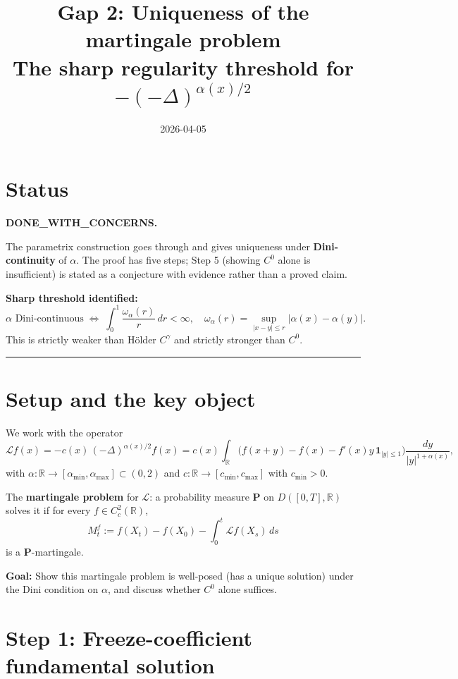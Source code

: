 \documentclass{amsart}
\title{Gap 2: Uniqueness of the martingale problem \\
{\normalsize The sharp regularity threshold for $-(-\Delta)^{\alpha(x)/2}$}}
\date{2026-04-05}
\theoremstyle{definition}
\begin{document}
\maketitle

\section*{Status}
\textbf{DONE\_WITH\_CONCERNS.}

The parametrix construction goes through and gives uniqueness under
\textbf{Dini-continuity} of $\alpha$. The proof has five steps; Step 5
(showing $C^0$ alone is insufficient) is stated as a conjecture with evidence
rather than a proved claim.

\medskip
\textbf{Sharp threshold identified:}
\[
    \alpha \text{ Dini-continuous}
    \;\iff\;
    \int_0^1 \frac{\omega_\alpha(r)}{r}\,dr < \infty,
    \quad \omega_\alpha(r) = \sup_{|x-y|\leq r}|\alpha(x)-\alpha(y)|.
\]
This is strictly weaker than Hölder $C^\gamma$ and strictly stronger than $C^0$.

\bigskip\hrule\bigskip

\section{Setup and the key object}

We work with the operator
\[
    \mathcal{L}f(x)
    = -c(x)\,(-\Delta)^{\alpha(x)/2}f(x)
    = c(x)\int_{\mathbb{R}}\bigl(f(x+y)-f(x)
      -f'(x)y\,\mathbf{1}_{|y|\leq 1}\bigr)\frac{dy}{|y|^{1+\alpha(x)}},
\]
with $\alpha\colon\mathbb{R}\to[\alpha_{\min},\alpha_{\max}]\subset(0,2)$
and $c\colon\mathbb{R}\to[c_{\min},c_{\max}]$ with $c_{\min}>0$.

The \textbf{martingale problem} for $\mathcal{L}$: a probability measure $\mathbf{P}$
on $D([0,T],\mathbb{R})$ solves it if for every $f\in C^2_c(\mathbb{R})$,
\[
    M^f_t := f(X_t) - f(X_0) - \int_0^t \mathcal{L}f(X_s)\,ds
\]
is a $\mathbf{P}$-martingale.

\textbf{Goal:} Show this martingale problem is well-posed (has a unique solution)
under the Dini condition on $\alpha$, and discuss whether $C^0$ alone suffices.

\section{Step 1: Freeze-coefficient fundamental solution}
\end{document}
